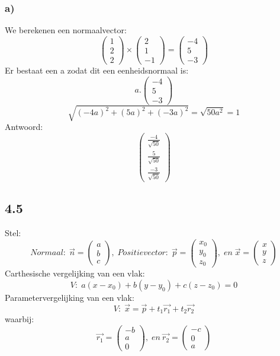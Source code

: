 \documentclass[11pt]{article}
\begin{document}
\subsubsection*{a)}
We berekenen een normaalvector:\\
\[
\begin{pmatrix}
1\\2\\2
\end{pmatrix}
\times
\begin{pmatrix}
2\\1\\-1
\end{pmatrix}
=
\begin{pmatrix}
-4\\5\\-3
\end{pmatrix}
\]
Er bestaat een a zodat dit een eenheidsnormaal is:\\
\[
a.
\begin{pmatrix}
-4\\5\\-3
\end{pmatrix}
\]
\[
\sqrt{(-4a)^2 + (5a)^2 + (-3a)^2} = \sqrt{50a^2} = 1
\]
Antwoord:\\
\[
\begin{pmatrix}
\frac{-4}{\sqrt{50}}\\\frac{5}{\sqrt{50}}\\\frac{-3}{\sqrt{50}}
\end{pmatrix}
\]

\subsection*{4.5}
Stel:\\
\[
Normaal:\;\vec{n}=\begin{pmatrix}
a\\b\\c
\end{pmatrix}
,\;Positievector:\;\vec{p}=\begin{pmatrix}
x_0\\y_0\\z_0
\end{pmatrix},\; en \;
\vec{x}=\begin{pmatrix}
x\\y\\z
\end{pmatrix}
\]
Carthesische vergelijking van een vlak: \\
\[V:\;a(x-x_0)+b(y-y_0)+c(z-z_0)=0\]
Parametervergelijking van een vlak: \\
\[ V:\;\vec{x}=\vec{p}+t_1\vec{r_1}+t_2\vec{r_2}\]
waarbij:\\
\[\vec{r_1}=\begin{pmatrix}
-b\\a\\0
\end{pmatrix},\;en\:
\vec{r_2}=\begin{pmatrix}
-c\\0\\a
\end{pmatrix}\]
\end{document}
